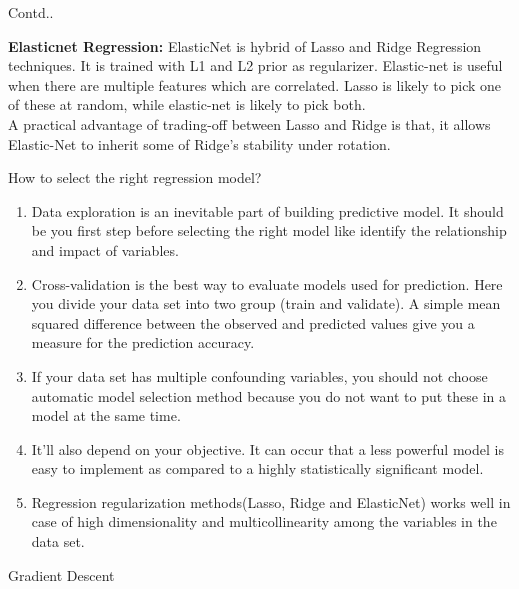 \documentclass{beamer}
\begin{document}
\begin{frame}{Contd..}
\begin{flushleft}
	\textbf{Elasticnet Regression:}
ElasticNet is hybrid of Lasso and Ridge Regression techniques. It is trained with L1 and L2 prior as regularizer. Elastic-net is useful when there are multiple features which are correlated. Lasso is likely to pick one of these at random, while elastic-net is likely to pick both.
\\
\vspace{10pt}
A practical advantage of trading-off between Lasso and Ridge is that, it allows Elastic-Net to inherit some of Ridge’s stability under rotation.
\end{flushleft}
\end{frame}
\begin{frame}{How to select the right regression model?}
\begin{enumerate}
	\item Data exploration is an inevitable part of building predictive model. It should be you first step before selecting the right model like identify the relationship and impact of variables.
	\item Cross-validation is the best way to evaluate models used for prediction. Here you divide your data set into two group (train and validate). A simple mean squared difference between the observed and predicted values give you a measure for the prediction accuracy.
	\item If your data set has multiple confounding variables, you should not choose automatic model selection method because you do not want to put these in a model at the same time.
	\item It’ll also depend on your objective. It can occur that a less powerful model is easy to implement as compared to a highly statistically significant model.
	\item Regression regularization methods(Lasso, Ridge and ElasticNet) works well in case of high dimensionality and multicollinearity among the variables in the data set.
\end{enumerate}
\end{frame}
\begin{frame}{Gradient Descent}
	
\end{frame}
\end{document}
